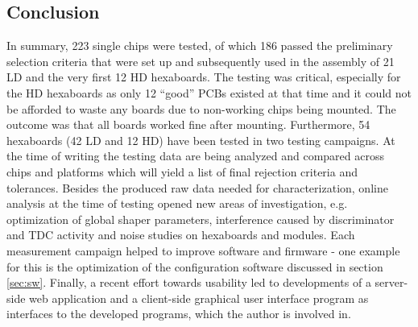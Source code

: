 \documentclass[../../main.tex]{subfiles}
\begin{document}
\subsection{Conclusion}
In summary, 223 single chips were tested, of which 186 passed the preliminary selection criteria that were set up and subsequently used in the assembly of 21 LD and the very first 12 HD hexaboards. The testing was critical, especially for the HD hexaboards as only 12 ``good'' PCBs existed at that time and it could not be afforded to waste any boards due to non-working chips being mounted. The outcome was that all boards worked fine after mounting. Furthermore, 54 hexaboards (42 LD and 12 HD) have been tested in two testing campaigns. At the time of writing the testing data are being analyzed and compared across chips and platforms which will yield a list of final rejection criteria and tolerances. Besides the produced raw data needed for characterization, online analysis at the time of testing opened new areas of investigation, e.g.  optimization of global shaper parameters, interference caused by discriminator and TDC activity and noise studies on hexaboards and modules. Each measurement campaign helped to improve software and firmware - one example for this is the optimization of the configuration software discussed in section \ref{sec:sw}. Finally, a recent effort towards usability led to developments of a server-side web application and a client-side graphical user interface program as interfaces to the developed programs, which the author is involved in.
\end{document}
